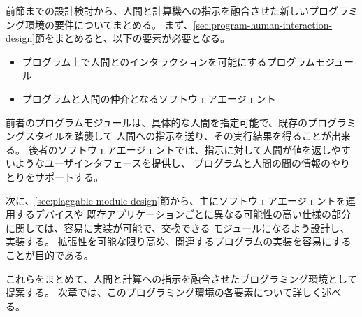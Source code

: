 前節までの設計検討から、人間と計算機への指示を融合させた新しいプログラミング環境の要件についてまとめる。
まず、\ref{sec:program-human-interaction-design}節をまとめると、以下の要素が必要となる。

\begin{itemize}
\itemsep1pt\parskip0pt
\item
  プログラム上で人間とのインタラクションを可能にするプログラムモジュール
\item
  プログラムと人間の仲介となるソフトウェアエージェント
\end{itemize}

前者のプログラムモジュールは、具体的な人間を指定可能で、既存のプログラミングスタイルを踏襲して
人間への指示を送り、その実行結果を得ることが出来る。
後者のソフトウェアエージェントでは、指示に対して人間が値を返しやすいようなユーザインタフェースを提供し、
プログラムと人間の間の情報のやりとりをサポートする。

次に、\ref{sec:plaggable-module-design}節から、主にソフトウェアエージェントを運用するデバイスや
既存アプリケーションごとに異なる可能性の高い仕様の部分に関しては、容易に実装が可能で、交換できる
モジュールになるよう設計し、実装する。
拡張性を可能な限り高め、関連するプログラムの実装を容易にすることが目的である。

これらをまとめて、人間と計算への指示を融合させたプログラミング環境として提案する。
次章では、このプログラミング環境の各要素について詳しく述べる。

